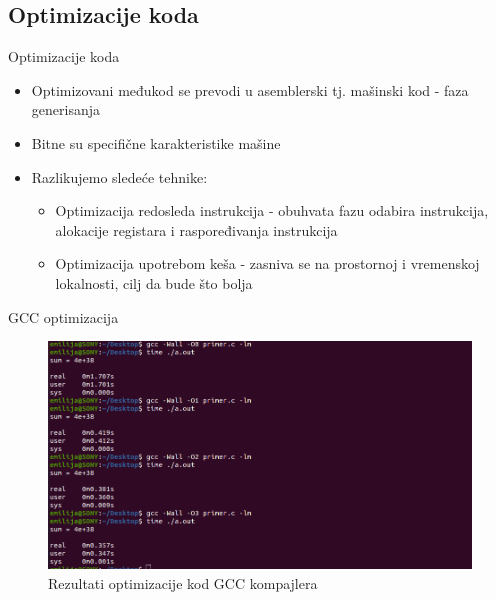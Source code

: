 \documentclass[compress, containsverbatim,mathserif, xcolor=dvipsnames, unicode]{beamer}
\begin{document}
\subsection{Optimizacije koda}
\begin{frame}{Optimizacije koda}
    
    \begin{itemize}
        \item Optimizovani međukod se prevodi u asemblerski tj. mašinski kod - faza generisanja
        \item  Bitne su specifične karakteristike mašine
        \item Razlikujemo  sledeće tehnike: 
                \begin{itemize}
                    \item Optimizacija redosleda instrukcija - obuhvata fazu odabira instrukcija, alokacije registara i raspoređivanja instrukcija
                    \item Optimizacija upotrebom keša - zasniva se na prostornoj i vremenskoj lokalnosti, cilj da bude što bolja
                \end{itemize}
        \end{itemize}
\end{frame}







\begin{frame}{GCC optimizacija} %
    \begin{figure}[h!]
        \begin{center}
       \includegraphics[scale = 0.2]{../pics/test.png}
       \end{center}
       \caption{Rezultati optimizacije kod GCC kompajlera}
    \end{figure} 
\end{frame}
\end{document}
